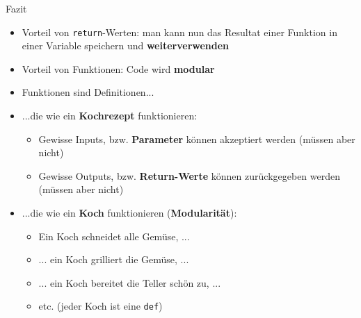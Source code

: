 \begin{frame}{Fazit}
	\begin{itemize}[<+->]
		\item {} Vorteil von \lstinline|return|-Werten: man kann nun das Resultat einer Funktion in einer Variable speichern und \textbf{weiterverwenden}
		\item {} Vorteil von Funktionen: Code wird \textbf{modular}
		\item Funktionen sind Definitionen...
		\item {} ...die wie ein \textbf{Kochrezept} funktionieren:
		      \begin{itemize}
			      \item {}   Gewisse Inputs, bzw. \textbf{Parameter} können akzeptiert werden (müssen aber nicht)
			      \item {} Gewisse Outputs, bzw. \textbf{Return-Werte} können zurückgegeben werden (müssen aber nicht)
		      \end{itemize}
		\item {} ...die wie ein \textbf{Koch} funktionieren (\textbf{Modularität}):
		      \begin{itemize}
			      \item Ein Koch schneidet alle Gemüse, ...
			      \item ... ein Koch grilliert die Gemüse, ...
			      \item ... ein Koch bereitet die Teller schön zu, ...
			      \item etc. (jeder Koch ist eine \lstinline|def|)
		      \end{itemize}
	\end{itemize}
\end{frame}